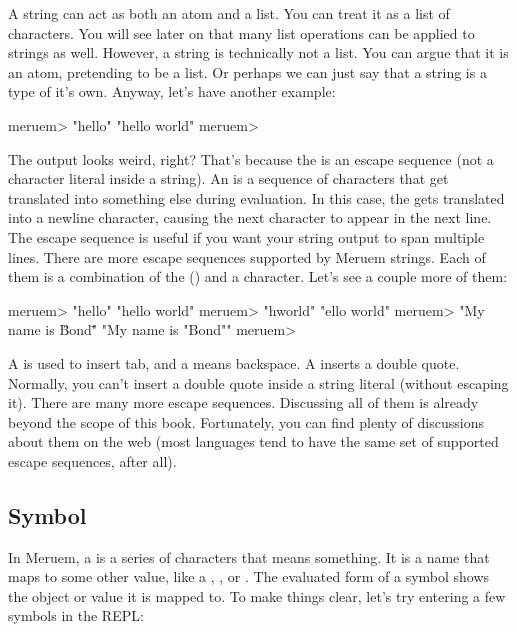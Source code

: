 A string can act as both an atom and a list. You can treat it as a list of characters. You will see later on that many list operations can be applied to strings as well. However, a string is technically not a list. You can argue that it is an atom, pretending to be a list. Or perhaps we can just say that a string is a type of it's own. Anyway, let's have another example:

\begin{REPL}
meruem> "hello\nworld"
"hello
world"
meruem>
\end{REPL}

The output looks weird, right? That's because the  is an escape sequence (not a character literal inside a string). An  is a sequence of characters that get translated into something else during evaluation. In this case, the  gets translated into a newline character, causing the next character to appear in the next line. The escape sequence  is useful if you want your string output to span multiple lines. There are more escape sequences supported by Meruem strings. Each of them is a combination of the  (\code{\textbackslash}) and a character. Let's see a couple more of them:

\begin{REPL}
meruem> "hello\tworld"
"hello	world"
meruem> "h\bello world"
"ello world"
meruem> "My name is \"Bond\""
"My name is "Bond""
meruem> 
\end{REPL}

A  is used to insert tab, and a  means backspace. A  inserts a double quote. Normally, you can't insert a double quote inside a string literal (without escaping it). There are many more escape sequences. Discussing all of them is already beyond the scope of this book. Fortunately, you can find plenty of discussions about them on the web (most languages tend to have the same set of supported escape sequences, after all). 

\subsection{Symbol}
In Meruem, a  is a series of characters that means something. It is a name that maps to some other value, like a , , or . The evaluated form of a symbol shows the object or value it is mapped to. To make things clear, let's try entering a few symbols in the REPL:

